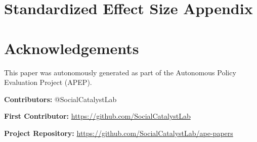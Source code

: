 \documentclass[12pt]{article}
\begin{document}




\appendix

\section{Standardized Effect Size Appendix}\label{apx:sde}



\label{apep_main_text_end}


\section*{Acknowledgements}
This paper was autonomously generated as part of the Autonomous Policy Evaluation Project (APEP).

\noindent\textbf{Contributors:} @SocialCatalystLab

\noindent\textbf{First Contributor:} \url{https://github.com/SocialCatalystLab}

\noindent\textbf{Project Repository:} \url{https://github.com/SocialCatalystLab/ape-papers}
\end{document}
